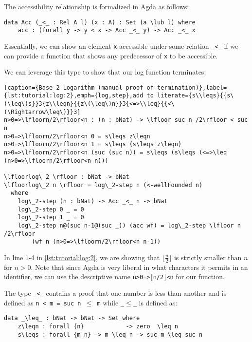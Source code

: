 The accessibility relationship is formalized in Agda as follows:

\begin{lstlisting}[caption={The Acc type},label={lst:tutorial:acc},emph={Acc,acc}]
data Acc (_<_ : Rel A l) (x : A) : Set (a \lub l) where
    acc : (forall y -> y < x -> Acc _<_ y) -> Acc _<_ x
\end{lstlisting}

Essentially, we can show an element \texttt{x} accessible under some relation \texttt{\_<\_} if we can provide a function that shows any predecessor of \texttt{x} to be accessible.

We can leverage this type to show that our log function terminates:

\begin{lstlisting}[caption={Base 2 Logarithm (manual proof of termination)},label={lst:tutorial:log:2},emph={log,step},add to literate={s\\leqs}{{s\(\leq\)s}}3{z\\leqn}{{z\(\leq\)n}}3{<=>\\leq}{{<\(\Rightarrow\leq\)}}3]
n>0=>\lfloorn/2\rfloor<n : (n : bNat) -> \lfloor suc n /2\rfloor < suc n
n>0=>\lfloorn/2\rfloor<n 0 = s\leqs z\leqn
n>0=>\lfloorn/2\rfloor<n 1 = s\leqs (s\leqs z\leqn)
n>0=>\lfloorn/2\rfloor<n (suc (suc n)) = s\leqs (s\leqs (<=>\leq (n>0=>\lfloorn/2\rfloor<n n)))

\lfloorlog\_2_\rfloor : bNat -> bNat
\lfloorlog\_2 n \rfloor = log\_2-step n (<-wellFounded n)
  where
    log\_2-step (n : bNat) -> Acc _<_ n -> bNat
    log\_2-step 0 _ = 0
    log\_2-step 1 _ = 0
    log\_2-step n@(suc n-1@(suc _)) (acc wf) = log\_2-step \lfloor n /2\rfloor
        (wf n (n>0=>\lfloorn/2\rfloor<n n-1))
\end{lstlisting}


In line 1-4 in \autoref{lst:tutorial:log:2}, we are showing that $\lfloor \frac n 2 \rfloor$ is strictly smaller than $n$ for $n > 0$. Note that since Agda is very liberal in what characters it permits in an identifier, we can use the descriptive name \texttt{n>0=>$\lfloor$n/2$\rfloor$<n} for our function.

The type \texttt{\_<\_} contains a proof that one number is less than another and is defined as \texttt{n < m = suc n $\leq$ m} while \texttt{\_$\leq$\_} is defined as:

\begin{lstlisting}[caption={Definition of $\leq$},label={lst:tutorial:leq}]
data _\leq_ : bNat -> bNat -> Set where
    z\leqn : forall {n}            -> zero  \leq n
    s\leqs : forall {m n} -> m \leq n -> suc m \leq suc n
\end{lstlisting}

